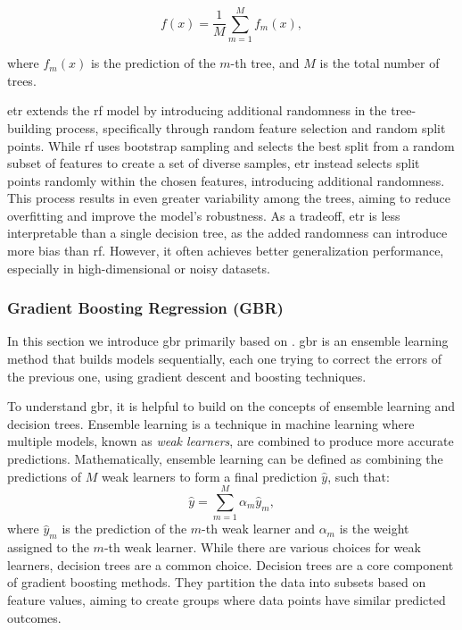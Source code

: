 $$
f(x) = \frac{1}{M} \sum_{m=1}^{M} f_m(x),
$$

where $f_m(x)$ is the prediction of the $m$-th tree, and $M$ is the total number of trees.

\gls{etr} extends the \gls{rf} model by introducing additional randomness in the tree-building process, specifically through random feature selection and random split points.
While \gls{rf} uses bootstrap sampling and selects the best split from a random subset of features to create a set of diverse samples, \gls{etr} instead selects split points randomly within the chosen features, introducing additional randomness.
This process results in even greater variability among the trees, aiming to reduce overfitting and improve the model's robustness.
As a tradeoff, \gls{etr} is less interpretable than a single decision tree, as the added randomness can introduce more bias than \gls{rf}.
However, it often achieves better generalization performance, especially in high-dimensional or noisy datasets.

\subsubsection{Gradient Boosting Regression (GBR)}\label{sec:gradientboost}
In this section we introduce \gls{gbr} primarily based on \citet{James2023AnIS}.
\gls{gbr} is an ensemble learning method that builds models sequentially, each one trying to correct the errors of the previous one, using gradient descent and boosting techniques.

To understand \gls{gbr}, it is helpful to build on the concepts of ensemble learning and decision trees.
Ensemble learning is a technique in machine learning where multiple models, known as \textit{weak learners}, are combined to produce more accurate predictions.
Mathematically, ensemble learning can be defined as combining the predictions of $M$ weak learners to form a final prediction $\hat{y}$, such that:
\begin{equation}
    \hat{y} = \sum_{m=1}^{M} \alpha_m \hat{y}_m,
\end{equation}
where $\hat{y}_m$ is the prediction of the $m$-th weak learner and $\alpha_m$ is the weight assigned to the $m$-th weak learner.
While there are various choices for weak learners, decision trees are a common choice.
Decision trees are a core component of gradient boosting methods.
They partition the data into subsets based on feature values, aiming to create groups where data points have similar predicted outcomes.

